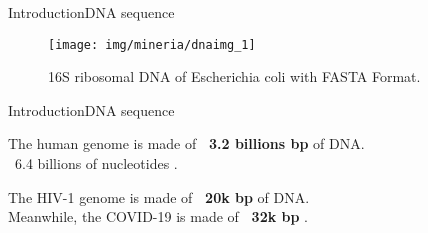 \documentclass[10pt]{beamer}
\newcommand{\1}{
	\setbeamertemplate{background}{
		\texttt{[image: img/1\_dna]}
		\tikz[overlay] \fill[fill opacity=0.75,fill=white] (0,0) rectangle (-\paperwidth,\paperheight);
	}
}
\begin{document}
\begin{frame}{Introduction}{DNA sequence}
	\begin{figure}[]
		\centering
		\texttt{[image: img/mineria/dnaimg\_1]}
		\label{img:mot2}
		\caption{16S ribosomal DNA of Escherichia coli with FASTA Format.}
	\end{figure}
\end{frame}

\begin{frame}{Introduction}{DNA sequence}%
	\begin{block}{}
		\centering
		The human genome is made of \textbf{\string ~3.2 billions bp} of DNA. \\
		\string ~6.4 billions of nucleotides \cite{archibald2018genomics}.
	\end{block}
	
	\begin{block}{}
		\centering
		The HIV-1 genome is made of \textbf{\string ~20k bp} of DNA. \\
		Meanwhile, the COVID-19 is made of \textbf{\string ~32k bp} \cite{randhawa2020machine}.
	\end{block}	
\end{frame}

\end{document}
